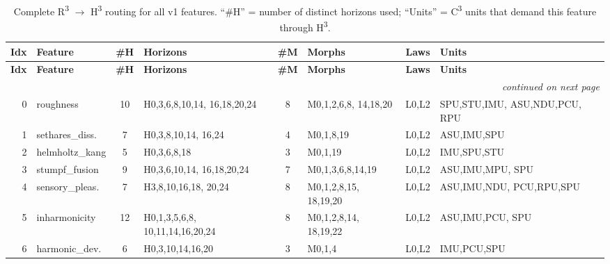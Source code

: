 {\small
\renewcommand{\arraystretch}{1.05}
\begin{longtable}{@{}
  r
  >{\raggedright}p{2.1cm}
  c
  >{\raggedright}p{3.5cm}
  c
  >{\raggedright}p{3.0cm}
  c
  >{\raggedright\arraybackslash}p{2.8cm}
@{}}
\caption{Complete R\textsuperscript{3} $\to$ H\textsuperscript{3} routing
for all v1 features.  ``\#H'' = number of distinct horizons used;
``Units'' = C\textsuperscript{3} units that demand this feature
through H\textsuperscript{3}.}
\label{tab:r3-routing} \\
\toprule
\textbf{Idx} & \textbf{Feature} & \textbf{\#H} & \textbf{Horizons}
  & \textbf{\#M} & \textbf{Morphs} & \textbf{Laws}
  & \textbf{Units} \\
\midrule
\endfirsthead
\toprule
\textbf{Idx} & \textbf{Feature} & \textbf{\#H} & \textbf{Horizons}
  & \textbf{\#M} & \textbf{Morphs} & \textbf{Laws}
  & \textbf{Units} \\
\midrule
\endhead
\midrule
\multicolumn{8}{r}{\footnotesize\itshape continued on next page} \\
\endfoot
\bottomrule
\endlastfoot

\rowcolor{grpA}
0  & roughness        & 10 & H0,3,6,8,10,14, 16,18,20,24
   & 8  & M0,1,2,6,8, 14,18,20 & L0,L2
   & SPU,STU,IMU, ASU,NDU,PCU, RPU \\
\rowcolor{grpA}
1  & sethares\_diss.  &  7 & H0,3,8,10,14, 16,24
   & 4  & M0,1,8,19 & L0,L2
   & ASU,IMU,SPU \\
\rowcolor{grpA}
2  & helmholtz\_kang  &  5 & H0,3,6,8,18
   & 3  & M0,1,19 & L0,L2
   & IMU,SPU,STU \\
\rowcolor{grpA}
3  & stumpf\_fusion   &  9 & H0,3,6,10,14, 16,18,20,24
   & 7  & M0,1,3,6,8,14,19 & L0,L2
   & ASU,IMU,MPU, SPU \\
\rowcolor{grpA}
4  & sensory\_pleas.  &  7 & H3,8,10,16,18, 20,24
   & 8  & M0,1,2,8,15, 18,19,20 & L0,L2
   & ASU,IMU,NDU, PCU,RPU,SPU \\
\rowcolor{grpA}
5  & inharmonicity    & 12 & H0,1,3,5,6,8, 10,11,14,16,20,24
   & 8  & M0,1,2,8,14, 18,19,22 & L0,L2
   & ASU,IMU,PCU, SPU \\
\rowcolor{grpA}
6  & harmonic\_dev.   &  6 & H0,3,10,14,16,20
   & 3  & M0,1,4 & L0,L2
   & IMU,PCU,SPU \\


\end{longtable}}
